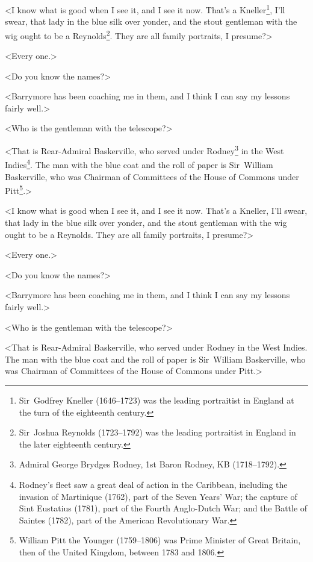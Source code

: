 \begin{withfootnotes}
<I know what is good when I see it, and I see it now. That's a Kneller\footnote{Sir~Godfrey Kneller (1646--1723) was the leading portraitist in England at the turn of the eighteenth century.}, I'll swear, that lady in the blue silk over yonder, and the stout gentleman with the wig ought to be a Reynolds\footnote{Sir~Joshua Reynolds (1723--1792) was the leading portraitist in England in the later eighteenth century.}. They are all family portraits, I presume?>

<Every one.>

<Do you know the names?>

<Barrymore has been coaching me in them, and I think I can say my lessons fairly well.>

<Who is the gentleman with the telescope?>

<That is Rear-Admiral Baskerville, who served under Rodney\footnote{Admiral George Brydges Rodney, 1st Baron Rodney, KB (1718--1792).} in the West Indies\footnote{Rodney's fleet saw a great deal of action in the Caribbean, including the invasion of Martinique (1762), part of the Seven Years' War; the capture of Sint Eustatius (1781), part of the Fourth Anglo-Dutch War; and the Battle of Saintes (1782), part of the American Revolutionary War.}. The man with the blue coat and the roll of paper is Sir~William Baskerville, who was Chairman of Committees of the House of Commons under Pitt\footnote{William Pitt the Younger (1759--1806) was Prime Minister of Great Britain, then of the United Kingdom, between 1783 and 1806.}.>
\end{withfootnotes}

\begin{withoutfootnotes}
<I know what is good when I see it, and I see it now. That's a Kneller, I'll swear, that lady in the blue silk over yonder, and the stout gentleman with the wig ought to be a Reynolds. They are all family portraits, I presume?>

<Every one.>

<Do you know the names?>

<Barrymore has been coaching me in them, and I think I can say my lessons fairly well.>

<Who is the gentleman with the telescope?>

<That is Rear-Admiral Baskerville, who served under Rodney in the West Indies. The man with the blue coat and the roll of paper is Sir~William Baskerville, who was Chairman of Committees of the House of Commons under Pitt.>
\end{withoutfootnotes}

